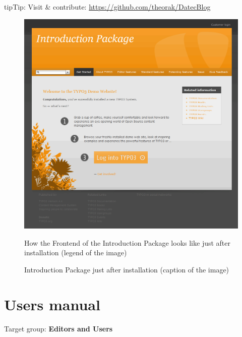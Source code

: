 \documentclass[a4paper,10pt,english]{sphinxmanual}
\begin{document}
\begin{notice}{tip}{Tip:}
Visit \& contribute: \href{https://github.com/theorak/DatecBlog}{https://github.com/theorak/DatecBlog}
\end{notice}
\begin{figure}[htbp]
\centering
\capstart

\includegraphics{IntroductionPackage.png}
\caption{Introduction Package just after installation (caption of the image)}{\small 
How the Frontend of the Introduction Package looks like just after installation (legend of the image)
}\end{figure}


\chapter{Users manual}
\label{UsersManual/Index:users-manual}\label{UsersManual/Index::doc}\label{UsersManual/Index:id1}
Target group: \textbf{Editors and Users}
\end{document}
